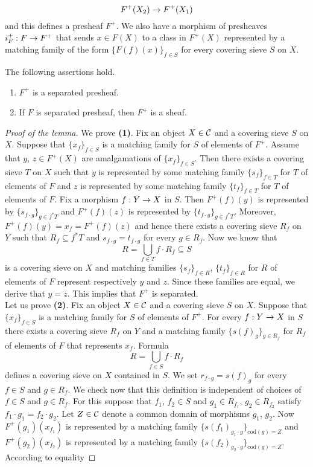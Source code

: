 $$F^+(X_2)\rightarrow F^+(X_1)$$
and this defines a presheaf $F^+$. We also have a morphism of presheaves $i_F^+:F\rightarrow F^+$ that sends $x\in F(X)$ to a class in $F^+(X)$ represented by a matching family of the form $\{F(f)(x)\}_{f\in S}$ for every covering sieve $S$ on $X$.
\begin{lemma}\label{lemma:plusconstruction}
The following assertions hold.
\begin{enumerate}[label=\emph{\textbf{(\arabic*)}}, leftmargin=1.5em]
\item $F^+$ is a separated presheaf.
\item If $F$ is separated presheaf, then $F^+$ is a sheaf.
\end{enumerate} 
\end{lemma}
\begin{proof}[Proof of the lemma]
We prove \textbf{(1)}. Fix an object $X\in {\mathcal C}$ and a covering sieve $S$ on $X$. Suppose that $\{x_f\}_{f\in S}$ is a matching family for $S$ of elements of $F^+$. Assume that $y$, $z\in F^+(X)$ are amalgamations of $\{x_f\}_{f\in S}$. Then there exists a covering sieve $T$ on $X$ such that $y$ is represented by some matching family $\{s_f\}_{f\in T}$ for $T$ of elements of $F$ and $z$ is represented by some matching family $\{t_f\}_{f\in T}$ for $T$ of elements of $F$. Fix a morphism $f:Y\rightarrow X$ in $S$. Then $F^+(f)(y)$ is represented by $\{s_{f\cdot g}\}_{g\in f^*T}$ and $F^+(f)(z)$ is represented by $\{t_{f\cdot g}\}_{g\in f^*T}$. Moreover, $F^+(f)(y)=x_f=F^+(f)(z)$ and hence there exists a covering sieve $R_f$ on $Y$ such that $R_f\subseteq f^*T$ and $s_{f\cdot g}=t_{f\cdot g}$ for every $g\in R_f$. Now we know that 
$$R=\bigcup_{f\in T}f\cdot R_f\subseteq S$$
is a covering sieve on $X$ and matching families $\{s_f\}_{f\in R}$, $\{t_f\}_{f\in R}$ for $R$ of elements of $F$ represent respectively $y$ and $z$. Since these families are equal, we derive that $y=z$. This implies that $F^+$ is separated.\\
Let us prove \textbf{(2)}. Fix an object $X\in {\mathcal C}$ and a covering sieve $S$ on $X$. Suppose that $\{x_f\}_{f\in S}$ is a matching family for $S$ of elements of $F^+$. For every $f:Y\rightarrow X$ in $S$ there exists a covering sieve $R_f$ on $Y$ and a matching family $\{s(f)_g\}_{g\in R_f}$ for $R_f$ of elements of $F$ that represents $x_f$. Formula
$$R=\bigcup_{f\in S}f\cdot R_f$$
defines a covering sieve on $X$ contained in $S$. We set $r_{f\cdot g}=s(f)_g$ for every $f\in S$ and $g\in R_f$. We check now that this definition is independent of choices of $f\in S$ and $g\in R_f$. For this suppose that $f_1$, $f_2\in S$ and $g_1\in R_{f_1}$, $g_2\in R_{f_2}$ satisfy $f_1\cdot g_1=f_2\cdot g_2$. Let $Z\in {\mathcal C}$ denote a common domain of morphisms $g_1$, $g_2$. Now $F^+(g_1)(x_{f_1})$ is represented by a matching family $\{s(f_1)_{g_1\cdot g}\}_{\mathrm{cod}(g)=Z}$ and $F^+(g_2)(x_{f_2})$ is represented by a matching family $\{s(f_2)_{g_2\cdot g}\}_{\mathrm{cod}(g)=Z}$. According to equality

\end{proof}
